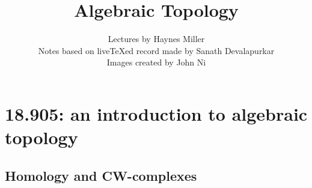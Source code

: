 \documentclass[11pt]{memoir}
\begin{document}
\title{Algebraic Topology}
\author{Lectures by Haynes Miller\\
Notes based on live{\TeX}ed record made by Sanath Devalapurkar\\
Images created by John Ni
}

\frontmatter

\maketitle

\newpage
\tableofcontents
\newpage

\mainmatter


\part{18.905: an introduction to algebraic topology}\label{905}

\chapter{Homology and CW-complexes}


\label{lec:3-categories}


\label{lec:6-homotopy-invariance-of-homology}



















\end{document}
